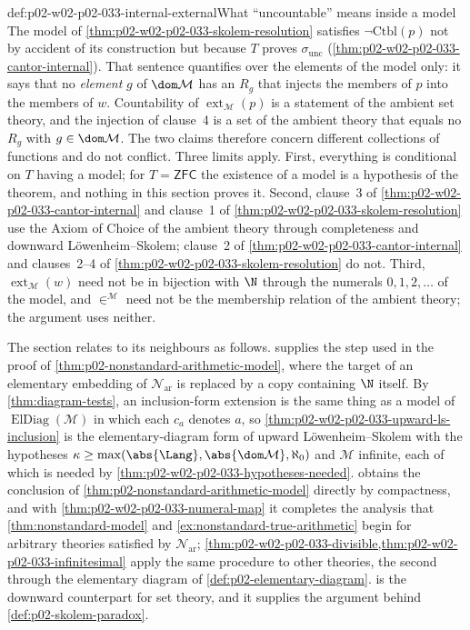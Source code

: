 \begin{hbwarning}{def:p02-w02-p02-033-internal-external}{What ``uncountable'' means inside a model}
The model of \cref{thm:p02-w02-p02-033-skolem-resolution} satisfies
\(\neg\mathrm{Ctbl}(p)\) not by accident of its construction but because
\(T\) proves \(\sigma_{\mathrm{unc}}\)
(\cref{thm:p02-w02-p02-033-cantor-internal}).  That sentence quantifies over
the elements of the model only: it says that no \emph{element} \(g\) of
\(\dom\mathcal M\) has an \(R_g\) that injects the members of \(p\) into the
members of \(w\).  Countability of \(\operatorname{ext}_{\mathcal M}(p)\)
is a statement of the ambient set theory, and the injection of clause~4
is a set of the ambient theory that equals no \(R_g\) with
\(g\in\dom\mathcal M\).  The two claims therefore concern different
collections of functions and do not conflict.  Three limits apply.
First, everything is conditional on \(T\) having a model; for
\(T=\mathsf{ZFC}\) the existence of a model is a hypothesis of the theorem,
and nothing in this section proves it.  Second, clause~3 of \cref{thm:p02-w02-p02-033-cantor-internal} and
clause~1 of \cref{thm:p02-w02-p02-033-skolem-resolution} use the Axiom of
Choice of the ambient theory through completeness and downward
L\"owenheim--Skolem; clause~2 of
\cref{thm:p02-w02-p02-033-cantor-internal} and clauses~2--4 of
\cref{thm:p02-w02-p02-033-skolem-resolution} do not.  Third,
\(\operatorname{ext}_{\mathcal M}(w)\) need not be in bijection with \(\N\)
through the numerals \(0,1,2,\ldots\) of the model, and
\(\in^{\mathcal M}\) need not be the membership relation of the ambient
theory; the argument uses neither.
\end{hbwarning}

The section relates to its neighbours as follows.
 supplies the step used in the
proof of \cref{thm:p02-nonstandard-arithmetic-model}, where the target of an
elementary embedding of \(\mathcal N_{\mathrm{ar}}\) is replaced by a copy
containing \(\N\) itself.  By \cref{thm:diagram-tests}, an inclusion-form
extension is the same thing as a model of \(\operatorname{ElDiag}(\mathcal M)\)
in which each \(c_a\) denotes \(a\), so
\cref{thm:p02-w02-p02-033-upward-ls-inclusion} is the elementary-diagram
form of upward L\"owenheim--Skolem with the hypotheses
\(\kappa\geq\max(\abs{\Lang},\abs{\dom\mathcal M},\aleph_0)\) and
\(\mathcal M\) infinite, each of which is needed by
\cref{thm:p02-w02-p02-033-hypotheses-needed}.
 obtains the conclusion of
\cref{thm:p02-nonstandard-arithmetic-model} directly by compactness, and with
\cref{thm:p02-w02-p02-033-numeral-map} it completes the analysis that
\cref{thm:nonstandard-model} and \cref{ex:nonstandard-true-arithmetic} begin
for arbitrary theories satisfied by \(\mathcal N_{\mathrm{ar}}\);
\cref{thm:p02-w02-p02-033-divisible,thm:p02-w02-p02-033-infinitesimal} apply
the same procedure to other theories, the second through the elementary
diagram of \cref{def:p02-elementary-diagram}.
 is the downward counterpart for
set theory, and it supplies the argument behind
\cref{def:p02-skolem-paradox}.

